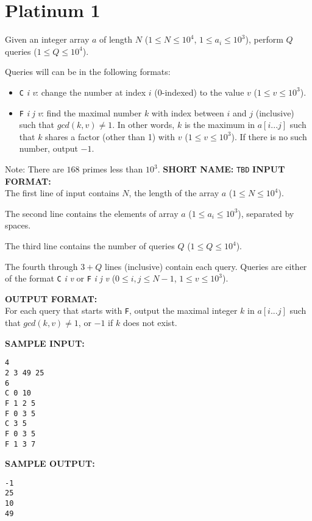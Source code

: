 \documentclass[twoside]{article}
\newcommand{\blank}{\vskip 3mm}
\begin{document}



\section{Platinum 1}

Given an integer array $a$ of length $N$ ($1 \leq N \leq 10^4$, $1 \leq a_i \leq 10^3$), perform $Q$ queries ($1 \leq Q \leq 10^4$).

Queries will can be in the following formats:
\begin{itemize}
    \item \verb|C| \textit{i} \textit{v}: change the number at index $i$ (0-indexed) to the value $v$ ($1 \leq v \leq 10^3$).
    \item \verb|F| \textit{i} \textit{j} \textit{v}:
    find the maximal number $k$ with index between $i$ and $j$ (inclusive) such that $gcd(k, v) \neq 1$. In other words, $k$ is the maximum in $a[i...j]$ such that $k$ shares a factor (other than 1) with $v$ ($1 \leq v \leq 10^3$). If there is no such number, output $-1$.
\end{itemize}

\blank
Note: There are $168$ primes less than $10^3$.
\blank
\textbf{SHORT NAME:} \verb|TBD|
\blank
\textbf{INPUT FORMAT:}\\
The first line of input contains $N$, the length of the array $a$ ($1 \leq N \leq 10^4$).

The second line contains the elements of array $a$ ($1 \leq a_i \leq 10^3$), separated by spaces.

The third line contains the number of queries $Q$ ($1 \leq Q \leq 10^4$).

The fourth through $3+Q$ lines (inclusive) contain each query. Queries are either of the format \verb|C| \textit{i} \textit{v} or \verb|F| \textit{i} \textit{j} \textit{v} ($0 \leq i, j \leq N-1$, $1 \leq v \leq 10^3$).

\blank
\textbf{OUTPUT FORMAT:}\\
For each query that starts with \verb|F|, output the maximal integer $k$ in $a[i...j]$ such that $gcd(k, v) \neq 1$, or $-1$ if $k$ does not exist.

\blank
\textbf{SAMPLE INPUT:}
\begin{verbatim}
4
2 3 49 25
6
C 0 10
F 1 2 5
F 0 3 5
C 3 5
F 0 3 5
F 1 3 7
\end{verbatim}


\textbf{SAMPLE OUTPUT:}
\begin{verbatim}
-1
25
10
49
\end{verbatim}
\end{document}
